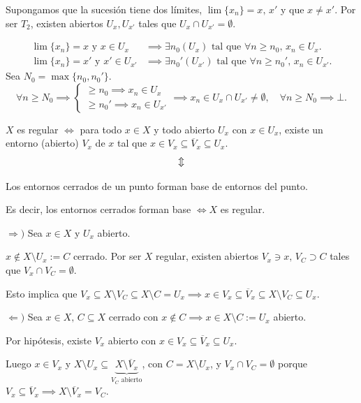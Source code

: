 \begin{dem}
    Supongamos que la sucesión tiene dos límites, $\lim \{x_n\} = x, \, x'$ y que $x \ne x'$. Por ser $T_2$, existen abiertos $U_x, U_{x'}$ tales que $U_x \cap U_{x'} = \emptyset$.
    
    \begin{align*}
        \lim \{x_n\} = x \text{ y } x \in U_x &\implies \exists n_0(U_x) \text{ tal que } \forall n \ge n_0, \, x_n \in U_x. \\
        \lim \{x_n\} = x' \text{ y } x' \in U_{x'} &\implies \exists n_0'(U_{x'}) \text{ tal que } \forall n \ge n_0', \, x_n \in U_{x'}.
    \end{align*}
    Sea $N_0 = \max\{n_0, n_0'\}$.
    \[
        \forall n \ge N_0 \implies 
        \begin{cases} 
            \ge n_0 \implies x_n \in U_x \\ 
            \ge n_0' \implies x_n \in U_{x'} 
        \end{cases} 
        \implies x_n \in U_x \cap U_{x'} \ne \emptyset, \quad \forall n \ge N_0 \implies \bot.
    \]
    \end{dem}
\begin{prop}
    $X$ es regular $\iff$ para todo $x \in X$ y todo abierto $U_x$ con $x \in U_x$, existe un entorno (abierto) $V_x$ de $x$ tal que $x \in V_x \subseteq \overline{V}_x \subseteq U_x$.\vspace{-0.3cm}
    \[\vspace{-0.4cm}
        \Updownarrow
    \]
    \begin{center}
        \small Los entornos cerrados de un punto forman base de entornos del punto.
    \end{center}
    Es decir, los entornos cerrados forman base $\iff X$ es regular.
\end{prop}

\begin{dem} $\Rightarrow) $ Sea $x \in X$ y $U_x$ abierto.
        
        $x \notin X \setminus U_x := C$ cerrado. Por ser $X$ regular, existen abiertos $V_x \ni x, \, V_C \supset C$ tales que $V_x \cap V_C = \emptyset$.
        
        Esto implica que $V_x \subseteq X \setminus V_C \subseteq X \setminus C = U_x \implies x \in V_x \subseteq \overline{V}_x \subseteq X \setminus V_C \subseteq U_x$.

        $\Leftarrow)$ Sea $x \in X, \, C \subseteq X$ cerrado con $x \notin C \implies x \in X \setminus C := U_x$ abierto.
        
        Por hipótesis, existe $V_x$ abierto con $x \in V_x \subseteq \overline{V}_x \subseteq U_x$.
        
        Luego $x \in V_x$ y $X \setminus U_x \subseteq \underbrace{X \setminus \overline{V}_x}_{V_C \text{ abierto}}$, con $C = X \setminus U_x$, y $V_x \cap V_C = \emptyset$ porque $V_x \subseteq \overline{V}_x \implies X \setminus \overline{V}_x = V_C$.
\end{dem}

